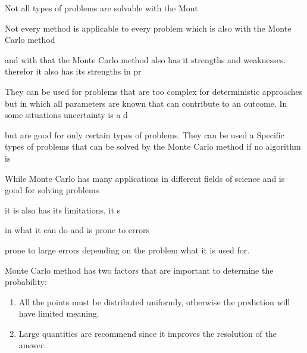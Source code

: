 Not all types of problems are solvable with the Mont

Not every method is applicable to every problem which is also with the Monte Carlo method 


and with that the Monte Carlo method also has it strengths and weaknesses.  therefor it also has its strengths in pr



They can be used for problems that are too complex for deterministic approaches but in which all parameters are known that can contribute to an outcome. In some situations uncertainty is a d

 but are good for only certain types of problems. They can be used a 
Specific types of problems that can be solved by the Monte Carlo method if no algorithm is

While Monte Carlo has many applications in different fields of science and is good for solving problems

 it is also has its limitations, it s

 in what it can do and is prone to errors

prone to large errors depending on the problem what it is used for. 



\label{subsec:Monte_Carlo_Pitfalls}


Monte Carlo method has two factors that are important to determine the probability:
\begin{enumerate}[1:]
	\item All the points must be distributed uniformly, otherwise the prediction will have limited meaning.
	\item Large quantities are recommend since it improves the resolution of the answer.
\end{enumerate}
